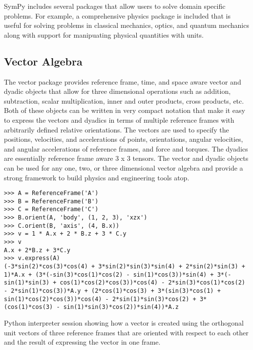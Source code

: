 SymPy includes several packages that allow users to solve domain specific
problems. For example, a comprehensive physics package is included that is
useful for solving problems in classical mechanics, optics, and quantum
mechanics along with support for manipuating physical quantities with units.

\subsection{Vector Algebra}

The vector package provides reference frame, time, and space aware vector and
dyadic objects that allow for three dimensional operations such as addition,
subtraction, scalar multiplication, inner and outer products, cross products,
etc. Both of these objects can be written in very compact notation that make it
easy to express the vectors and dyadics in terms of multiple reference frames
with arbitrarily defined relative orientations. The vectors are used to specify
the positions, velocities, and accelerations of points, orientations, angular
velocities, and angular accelerations of reference frames, and force and
torques. The dyadics are essentially reference frame aware 3 x 3 tensors. The
vector and dyadic objects can be used for any one, two, or three dimensional
vector algebra and provide a strong framework to build physics and engineering
tools atop.

\begin{listing}
  \begin{verbatim}
>>> A = ReferenceFrame('A')
>>> B = ReferenceFrame('B')
>>> C = ReferenceFrame('C')
>>> B.orient(A, 'body', (1, 2, 3), 'xzx')
>>> C.orient(B, 'axis', (4, B.x))
>>> v = 1 * A.x + 2 * B.z + 3 * C.y
>>> v
A.x + 2*B.z + 3*C.y
>>> v.express(A)
(-3*sin(2)*cos(3)*cos(4) + 3*sin(2)*sin(3)*sin(4) + 2*sin(2)*sin(3) + 1)*A.x + (3*(-sin(3)*cos(1)*cos(2) - sin(1)*cos(3))*sin(4) + 3*(-sin(1)*sin(3) + cos(1)*cos(2)*cos(3))*cos(4) - 2*sin(3)*cos(1)*cos(2) - 2*sin(1)*cos(3))*A.y + (2*cos(1)*cos(3) + 3*(sin(3)*cos(1) + sin(1)*cos(2)*cos(3))*cos(4) - 2*sin(1)*sin(3)*cos(2) + 3*(cos(1)*cos(3) - sin(1)*sin(3)*cos(2))*sin(4))*A.z
  \end{verbatim}
  \caption{Python interpreter session showing how a vector is created using the
    orthogonal unit vectors of three reference frames that are oriented with
    respect to each other and the result of expressing the vector in one frame.}
  \label{lis:physics-vector}
\end{listing}

